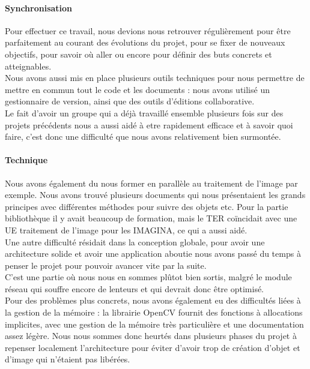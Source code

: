 \documentclass{report}
\begin{document}
		\paragraph{Synchronisation}
		Pour effectuer ce travail, nous devions nous retrouver régulièrement pour être parfaitement au courant des évolutions du projet, pour se fixer de nouveaux objectifs, pour savoir où aller ou encore pour définir des buts concrets et atteignables. \\
		Nous avons aussi mis en place plusieurs outils techniques pour nous permettre de mettre en commun tout le code et les documents : nous avons utilisé un gestionnaire de version, ainsi que des outils d'éditions collaborative. \\
		Le fait d'avoir un groupe qui a déjà travaillé ensemble plusieurs fois sur des projets précédents nous a aussi aidé à etre rapidement efficace et à savoir quoi faire, c'est donc une difficulté que nous avons relativement bien surmontée. \\
		
		\paragraph{Technique}
		Nous avons également du nous former en parallèle au traitement de l'image par exemple. Nous avons trouvé plusieurs documents qui nous présentaient les grands principes avec différentes méthodes pour suivre des objets etc. Pour la partie bibliothèque il y avait beaucoup de formation, mais le TER coïncidait avec une UE traitement de l'image pour les IMAGINA, ce qui a aussi aidé. \\
		Une autre difficulté résidait dans la conception globale, pour avoir une architecture solide et avoir une application aboutie nous avons passé du temps à penser le projet pour pouvoir avancer vite par la suite. \\ C'est une partie où nous nous en sommes plûtot bien sortis, malgré le module réseau qui souffre encore de lenteurs et qui devrait donc être optimisé. \\
		
		Pour des problèmes plus concrets, nous avons également eu des difficultés liées à la gestion de la mémoire : la librairie OpenCV fournit des fonctions à allocations implicites, avec une gestion de la mémoire très particulière et une documentation assez légère. Nous nous sommes donc heurtés dans plusieurs phases du projet à repenser localement l'architecture pour éviter d'avoir trop de création d'objet et d'image qui n'étaient pas libérées. \\
		
\end{document}
